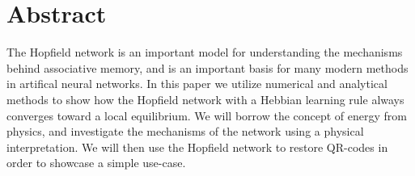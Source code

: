 \section{Abstract}
The Hopfield network is an important model for understanding the mechanisms behind associative memory, and is an important basis for many modern methods in artifical neural networks. In this paper we utilize numerical and analytical methods to show how the Hopfield network with a Hebbian learning rule always converges toward a local equilibrium. We will borrow the concept of energy from physics, and investigate the mechanisms of the network using a physical interpretation. We will then use the Hopfield network to restore QR-codes in order to showcase a simple use-case.